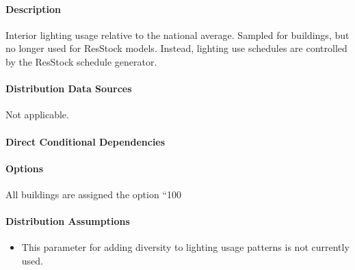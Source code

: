 \paragraph{Description}
% 
Interior lighting usage relative to the national average. Sampled for buildings, but no longer used for ResStock models. Instead, lighting use schedules are controlled by the ResStock schedule generator. 

\paragraph{Distribution Data Sources}
% 
Not applicable. 

\paragraph{Direct Conditional Dependencies}


\paragraph{Options}
All buildings are assigned the option ``100%

\paragraph{Distribution Assumptions}
% 
\begin{itemize}
 \item
  This parameter for adding diversity to lighting usage patterns is not
  currently used.
\end{itemize}
